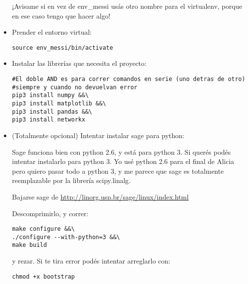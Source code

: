 \documentclass[10pt,a4paper]{report}
\begin{document}
\begin{itemize}
¡Avisame si en vez de env\_messi usás otro nombre para el virtualenv, porque en ese caso tengo que hacer algo!

\item Prender el entorno virtual:

\begin{lstlisting}
source env_messi/bin/activate
\end{lstlisting}

\item Instalar las librerías que necesita el proyecto:

\begin{lstlisting}
#El doble AND es para correr comandos en serie (uno detras de otro)
#siempre y cuando no devuelvan error
pip3 install numpy &&\
pip3 install matplotlib &&\
pip3 install pandas &&\
pip3 install networkx
\end{lstlisting}



\item (Totalmente opcional) Intentar instalar sage para python:


Sage funciona bien con python 2.6, y está  para python 3. Si querés podés intentar instalarlo para python 3. Yo usé python 2.6 para el final de Alicia pero quiero pasar todo a python 3, y me parece que sage es totalmente reemplazable por la librería scipy.linalg.

Bajarse sage de \url{http://linorg.usp.br/sage/linux/index.html}

Descomprimirlo, y correr:

\begin{lstlisting}
make configure &&\
./configure --with-python=3 &&\
make build
\end{lstlisting}

y rezar. Si te tira error  podés intentar arreglarlo con:

\begin{lstlisting}
chmod +x bootstrap
\end{lstlisting}

\end{itemize}
\end{document}
